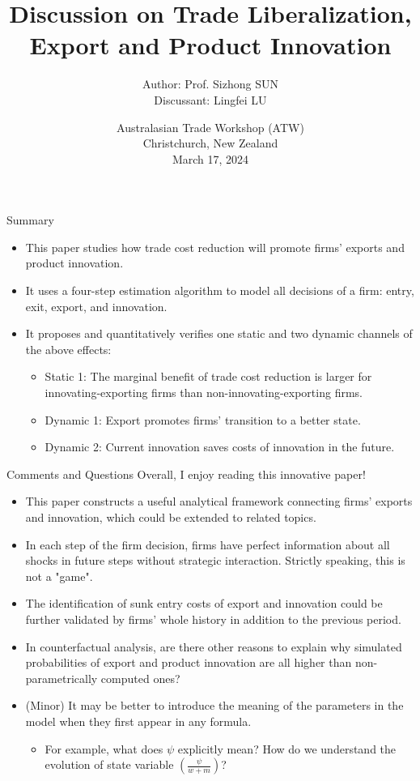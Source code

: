 \documentclass[10pt]{beamer}
\title[ERPT]{Discussion on Trade Liberalization, Export and Product Innovation}
\author{Author: Prof. Sizhong SUN \\ \vspace{2mm} Discussant: Lingfei LU}
\date{Australasian Trade Workshop (ATW) \\ \vspace{2mm} Christchurch, New Zealand \\ \vspace{4mm} March 17, 2024 }
\begin{document}
	
\begin{frame}
    \maketitle
    \centering
\end{frame}

\begin{frame}{Summary}
    \begin{itemize}
	\item This paper studies how trade cost reduction will promote firms' exports and product innovation.
        \item It uses a four-step estimation algorithm to model all decisions of a firm: entry, exit, export, and innovation.
        \item It proposes and quantitatively verifies one static and two dynamic channels of the above effects:
        \begin{itemize}
            \item Static 1: The marginal benefit of trade cost reduction is larger for innovating-exporting firms than non-innovating-exporting firms.
            \item Dynamic 1: Export promotes firms' transition to a better state.
            \item Dynamic 2: Current innovation saves costs of innovation in the future.
        \end{itemize}
    \end{itemize}
\end{frame}

\begin{frame}{Comments and Questions}
Overall, I enjoy reading this innovative paper!
    \begin{itemize}
        \item This paper constructs a useful analytical framework connecting firms' exports and innovation, which could be extended to related topics.
        \item In each step of the firm decision, firms have perfect information about all shocks in future steps without strategic interaction. Strictly speaking, this is not a "game".
        \item The identification of sunk entry costs of export and innovation could be further validated by firms' whole history in addition to the previous period.
        \item In counterfactual analysis, are there other reasons to explain why simulated probabilities of export and product innovation are all higher than non-parametrically computed ones?
        \item (Minor) It may be better to introduce the meaning of the parameters in the model when they first appear in any formula.
        \begin{itemize}
            \item For example, what does $\psi$ explicitly mean? How do we understand the evolution of state variable $(\frac{\psi}{{w+m}})$?
        \end{itemize}
    \end{itemize}
\end{frame}
\end{document}

